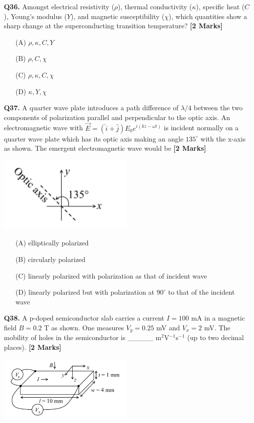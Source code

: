 \documentclass[11pt]{article}
\newcommand{\questionb}[2]{
    \noindent\textbf{Q#2.} #1 \hfill \textbf{[2 Marks]}
}
\begin{document}
\questionb{Amongst electrical resistivity (\(\rho\)), thermal conductivity (\(\kappa\)), specific heat (\(C\)), Young’s modulus (\(Y\)), and magnetic susceptibility (\(\chi\)), which quantities show a sharp change at the superconducting transition temperature?}{36}
\begin{enumerate}
    \item[(A)] \(\rho, \kappa, C, Y\)  
    \item[(B)] \(\rho, C, \chi\)  
    \item[(C)] \(\rho, \kappa, C, \chi\)  
    \item[(D)] \(\kappa, Y, \chi\)  
\end{enumerate}
\vspace{0.5cm}

\questionb{A quarter wave plate introduces a path difference of \(\lambda/4\) between the two components of polarization parallel and perpendicular to the optic axis. An electromagnetic wave with \(\vec{E} = (\hat{i} + \hat{j}) E_0 e^{i(kz - \omega t)}\) is incident normally on a quarter wave plate which has its optic axis making an angle \(135^\circ\) with the x-axis as shown. The emergent electromagnetic wave would be}{37}
\begin{center}
\includegraphics[width=0.5\textwidth]{figures/37.png}
\end{center}
\begin{enumerate}
    \item[(A)] elliptically polarized  
    \item[(B)] circularly polarized  
    \item[(C)] linearly polarized with polarization as that of incident wave  
    \item[(D)] linearly polarized but with polarization at \(90^\circ\) to that of the incident wave  
\end{enumerate}
\vspace{0.5cm}

\questionb{A p-doped semiconductor slab carries a current \(I = 100\) mA in a magnetic field \(B = 0.2\) T as shown. One measures \(V_y = 0.25\) mV and \(V_x = 2\) mV. The mobility of holes in the semiconductor is \_\_\_\_\_ m\(^2\)V\(^{-1}\)s\(^{-1}\) (up to two decimal places).}{38}
\begin{center}
\includegraphics[width=0.5\textwidth]{figures/38.png}
\end{center}
\vspace{0.5cm}
\end{document}
